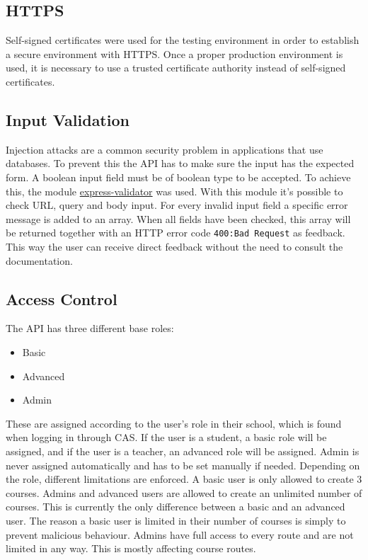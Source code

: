\subsection{HTTPS} \label{https}
Self-signed certificates were used for the testing environment in order to establish a secure environment with HTTPS. Once a proper production environment is used, it is necessary to use a trusted certificate authority instead of self-signed certificates.

\subsection{Input Validation}
Injection attacks are a common security problem in applications that use databases. To prevent this the API has to make sure the input has the expected form. A boolean input field must be of boolean type to be accepted. To achieve this, the module \href{https://github.com/ctavan/express-validator}{express-validator} was used. With this module it's possible to check URL, query and body input. For every invalid input field a specific error message is added to an array. When all fields have been checked, this array will be returned together with an HTTP error code \texttt{400:\@ Bad Request} as feedback. This way the user can receive direct feedback without the need to consult the documentation.

\subsection{Access Control}
The API has three different base roles:
\begin{itemize}
\item Basic
\item Advanced
\item Admin
\end{itemize}
These are assigned according to the user's role in their school, which is found when logging in through CAS. If the user is a student, a basic role will be assigned, and if the user is a teacher, an advanced role will be assigned. Admin is never assigned automatically and has to be set manually if needed. Depending on the role, different limitations are enforced. A basic user is only allowed to create 3 courses. Admins and advanced users are allowed to create an unlimited number of courses. This is currently the only difference between a basic and an advanced user. The reason a basic user is limited in their number of courses is simply to prevent malicious behaviour. Admins have full access to every route and are not limited in any way. This is mostly affecting course routes. 

